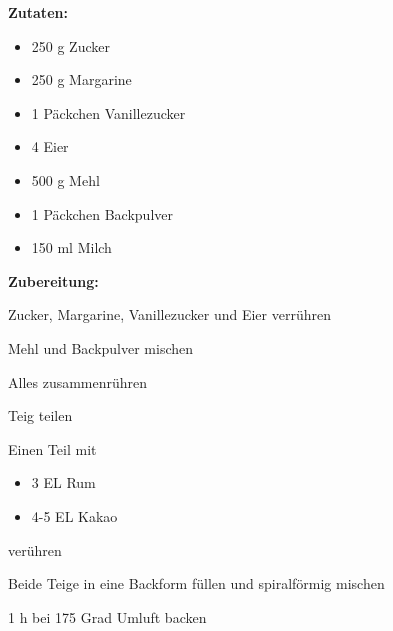 

\textbf {Zutaten:} \\
\begin{itemize}
	\item 250 g Zucker
	\item 250 g Margarine
	\item 1 Päckchen Vanillezucker
	\item 4 Eier
	\item 500 g Mehl
	\item 1 Päckchen Backpulver
	\item 150 ml Milch
\end{itemize}

\vspace* {2cm}

\textbf {Zubereitung:} \\
\begin{compactenum}
	\item Zucker, Margarine, Vanillezucker und Eier verrühren
	\item Mehl und Backpulver mischen
	\item Alles zusammenrühren
	\item Teig teilen
	\item Einen Teil mit 
	\begin{itemize}
		\item 3 EL Rum
		\item 4-5 EL Kakao
	\end{itemize}
	verühren
	\item Beide Teige in eine Backform füllen und spiralförmig mischen
	\item 1 h bei 175 Grad Umluft backen
\end{compactenum}



